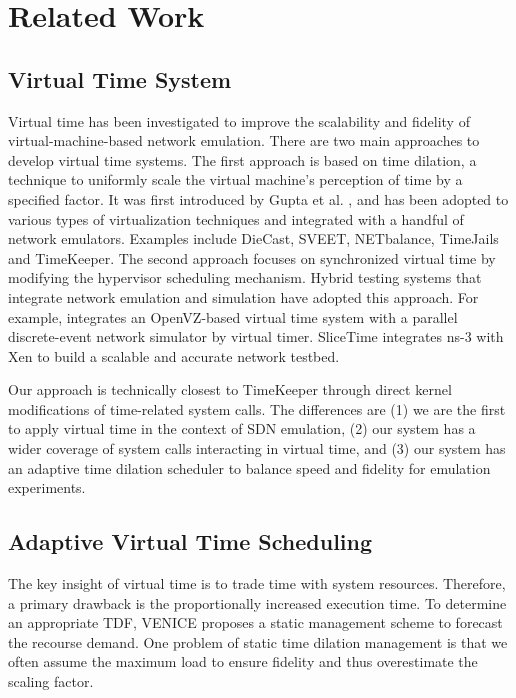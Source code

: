 \section{Related Work}
\label{Sec-RelatedWorks}

\subsection{Virtual Time System}
Virtual time has been investigated to improve the scalability and fidelity of virtual-machine-based network emulation. 
There are two main approaches to develop virtual time systems. The first approach is based on time dilation, a technique to uniformly scale the virtual machine's perception of time by a specified factor. 
It was first introduced by Gupta et al. \cite{ToInfinityBeyond}, and has been adopted to various types of virtualization techniques and integrated with a handful of network emulators. 
Examples include DieCast\cite{DieCast}, SVEET\cite{SVEET}, NETbalance\cite{NETbalance}, TimeJails\cite{ComparisonVR-VM, TimeJails} and TimeKeeper\cite{TimeKeeper}. 
The second approach focuses on synchronized virtual time by modifying the hypervisor scheduling mechanism. 
Hybrid testing systems that integrate network emulation and simulation have adopted this approach. 
For example, \cite{jin2012virtual} integrates an OpenVZ-based virtual time system \cite{VirtTimeOpenVZ} with a parallel discrete-event network simulator by virtual timer.
SliceTime\cite{SliceTime} integrates ns-3\cite{NS-3} with Xen to build a scalable and accurate network testbed.

Our approach is technically closest to TimeKeeper \cite{TimeKeeper} through direct kernel modifications of time-related system calls. 
The differences are (1) we are the first to apply virtual time in the context of SDN emulation, (2) our system has a wider coverage of system calls interacting in virtual time, and (3) our system has an adaptive time dilation scheduler to balance speed and fidelity for emulation experiments.

\subsection{Adaptive Virtual Time Scheduling}
The key insight of virtual time is to trade time with system resources. 
Therefore, a primary drawback is the proportionally increased execution time. To determine an appropriate TDF, VENICE \cite{VirtualTimeMachine} proposes a static management scheme to forecast the recourse demand. 
One problem of static time dilation management is that we often assume the maximum load to ensure fidelity and thus overestimate the scaling factor. 

